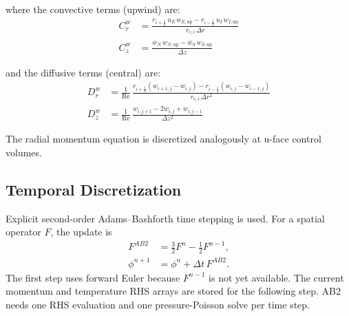 \documentclass[12pt,a4paper]{article}
\newcommand{\Rey}{\text{Re}}
\begin{document}
where the convective terms (upwind) are:
\begin{align}
    C_r^w &= \frac{r_{i+\frac{1}{2}}\,u_E\,w_{E,\text{up}} - r_{i-\frac{1}{2}}\,u_I\,w_{I,\text{up}}}{r_{c,i}\,\Delta r} \\
    C_z^w &= \frac{\bar{w}_N\,w_{N,\text{up}} - \bar{w}_S\,w_{S,\text{up}}}{\Delta z}
\end{align}

and the diffusive terms (central) are:
\begin{align}
    D_r^w &= \frac{1}{\Rey}\,\frac{r_{i+\frac{1}{2}}(w_{i+1,j}-w_{i,j}) - r_{i-\frac{1}{2}}(w_{i,j}-w_{i-1,j})}{r_{c,i}\,\Delta r^2} \\
    D_z^w &= \frac{1}{\Rey}\,\frac{w_{i,j+1} - 2w_{i,j} + w_{i,j-1}}{\Delta z^2}
\end{align}

The radial momentum equation is discretized analogously at u-face control volumes.

\subsection{Temporal Discretization}

Explicit second-order Adams--Bashforth time stepping is used. For a spatial
operator $F$, the update is
\begin{align}
    F^{AB2} &= \tfrac{3}{2}F^n-\tfrac{1}{2}F^{n-1}, \\
    \phi^{n+1} &= \phi^n+\Delta t\,F^{AB2}.
\end{align}
The first step uses forward Euler because $F^{n-1}$ is not yet available. The
current momentum and temperature RHS arrays are stored for the following step.
AB2 needs one RHS evaluation and one pressure-Poisson solve per time step.
\end{document}
